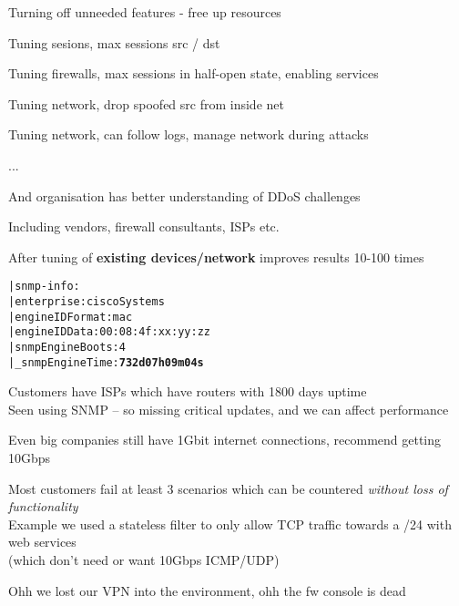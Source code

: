 \documentclass[Screen16to9,17pt]{foils}
\begin{document}

\begin{list1}
\item Turning off unneeded features - free up resources
\item Tuning sesions, max sessions src / dst
\item Tuning firewalls, max sessions in half-open state, enabling services
\item Tuning network, drop spoofed src from inside net \smiley
\item Tuning network, can follow logs, manage network during attacks
\item ...
\item And organisation has better understanding of DDoS challenges
\item Including vendors, firewall consultants, ISPs etc.
\end{list1}

\vskip 1cm
\centerline{After tuning of {\bf existing devices/network} improves results 10-100 times}



\begin{alltt}\small
| snmp-info:
|   enterprise: ciscoSystems
|   engineIDFormat: mac
|   engineIDData: 00:08:4f:xx:yy:zz
|   snmpEngineBoots: 4
|_  snmpEngineTime: {\bf 732d07h09m04s}
\end{alltt}


\begin{list2}
\item Customers have ISPs which have routers with 1800 days uptime\\
Seen using SNMP -- so missing critical updates, and we can affect performance
\item Even big companies still have 1Gbit internet connections, recommend getting 10Gbps
\item Most customers fail at least 3 scenarios which can be countered \emph{without loss of functionality}\\
Example we used a stateless filter to only allow TCP traffic towards a /24 with web services\\
(which don't need or want 10Gbps ICMP/UDP)

\item Ohh we lost our VPN into the environment, ohh the fw console is dead
\end{list2}



\end{document}
